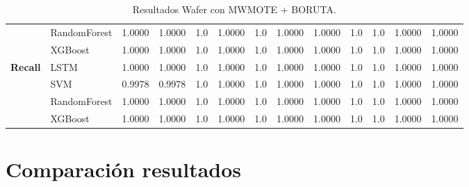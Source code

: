 \begin{table}[h]
\begin{adjustbox}{max width=15cm}
\begin{tabular}{|c|l|r|r|r|r|r|r|r|r|r|r|r|}
			& RandomForest &  1.0000 &  1.0000 &  1.0 &  1.0000 &  1.0 &  1.0000 &  1.0000 &  1.0 &  1.0 &  1.0000 &  1.0000 \\
			& XGBoost &  1.0000 &  1.0000 &  1.0 &  1.0000 &  1.0 &  1.0000 &  1.0000 &  1.0 &  1.0 &  1.0000 &  1.0000 \\
			\hline
			\textbf{Recall} & LSTM &  1.0000 &  1.0000 &  1.0 &  1.0000 &  1.0 &  1.0000 &  1.0000 &  1.0 &  1.0 &  1.0000 &  1.0000 \\
			& SVM &  0.9978 &  0.9978 &  1.0 &  1.0000 &  1.0 &  1.0000 &  1.0000 &  1.0 &  1.0 &  1.0000 &  1.0000 \\
			& RandomForest &  1.0000 &  1.0000 &  1.0 &  1.0000 &  1.0 &  1.0000 &  1.0000 &  1.0 &  1.0 &  1.0000 &  1.0000 \\
			& XGBoost &  1.0000 &  1.0000 &  1.0 &  1.0000 &  1.0 &  1.0000 &  1.0000 &  1.0 &  1.0 &  1.0000 &  1.0000 \\
			\hline
		\end{tabular}
	\end{adjustbox}
	\caption{Resultados Wafer con MWMOTE + BORUTA.}
	\label{tab:Wafer_MWMOTE_BORUTA}
\end{table}

\newpage


\section{Comparación resultados}
